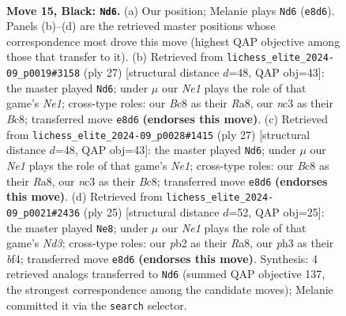 \documentclass[11pt]{article}
\begin{document}
\clearpage

\begin{figure}[p]\centering
\begin{subfigure}{0.46\textwidth}\centering
\resizebox{\linewidth}{!}{%
\newchessgame
\chessboard[
  setfen={r1bqn1k1/pppp1ppp/8/2bP4/8/2N4P/PPPB1PP1/R3QBK1 b - - 2 15},
  showmover=false,
  pgfstyle=straightmove, color=movearrow, markmove={e8-d6}
]}
\caption{}
\end{subfigure}\hfill
\begin{subfigure}{0.46\textwidth}\centering
\resizebox{\linewidth}{!}{%
\newchessgame
\chessboard[
  setfen={r1bqn1k1/ppp2ppp/5b2/3p4/3P1B2/2P5/PP1N1PPP/R3QBK1 b - - 1 14},
  showmover=false,
  pgfstyle=straightmove, color=movearrow, markmove={e8-d6}
]}
\caption{}
\end{subfigure}
\\[4pt]
\begin{subfigure}{0.46\textwidth}\centering
\resizebox{\linewidth}{!}{%
\newchessgame
\chessboard[
  setfen={r1bqn1k1/ppp2ppp/5b2/3p4/3P1B2/2P5/PP1N1PPP/R3QBK1 b - - 1 14},
  showmover=false,
  pgfstyle=straightmove, color=movearrow, markmove={e8-d6}
]}
\caption{}
\end{subfigure}\hfill
\begin{subfigure}{0.46\textwidth}\centering
\resizebox{\linewidth}{!}{%
\newchessgame
\chessboard[
  setfen={r1bq2k1/pppp1ppp/3n4/8/3b1B2/2N5/PPP2PPP/R3QBK1 b - - 1 13},
  showmover=false,
  pgfstyle=straightmove, color=movearrow, markmove={d6-e8}
]}
\caption{}
\end{subfigure}
\caption{\textbf{Move 15, Black: \texttt{Nd6}.} (a) Our position; Melanie plays \texttt{Nd6} (\texttt{e8d6}). Panels (b)--(d) are the retrieved master positions whose correspondence most drove this move (highest QAP objective among those that transfer to it). (b) Retrieved from \texttt{lichess\_elite\_2024-09\_p0019\#3158} (ply 27) [structural distance $d$=48, QAP obj=43]: the master played \texttt{Nd6}; under $\mu$ our \emph{Ne1} plays the role of that game's \emph{Ne1}; cross-type roles: our \emph{B}c8 as their \emph{R}a8, our \emph{n}c3 as their \emph{B}c8; transferred move \texttt{e8d6} \textbf{(endorses this move)}. (c) Retrieved from \texttt{lichess\_elite\_2024-09\_p0028\#1415} (ply 27) [structural distance $d$=48, QAP obj=43]: the master played \texttt{Nd6}; under $\mu$ our \emph{Ne1} plays the role of that game's \emph{Ne1}; cross-type roles: our \emph{B}c8 as their \emph{R}a8, our \emph{n}c3 as their \emph{B}c8; transferred move \texttt{e8d6} \textbf{(endorses this move)}. (d) Retrieved from \texttt{lichess\_elite\_2024-09\_p0021\#2436} (ply 25) [structural distance $d$=52, QAP obj=25]: the master played \texttt{Ne8}; under $\mu$ our \emph{Ne1} plays the role of that game's \emph{Nd3}; cross-type roles: our \emph{p}b2 as their \emph{R}a8, our \emph{p}h3 as their \emph{b}f4; transferred move \texttt{e8d6} \textbf{(endorses this move)}. Synthesis: 4 retrieved analogs transferred to \texttt{Nd6} (summed QAP objective 137, the strongest correspondence among the candidate moves); Melanie committed it via the \texttt{search} selector.}
\label{fig:thought-m29}
\end{figure}
\end{document}
